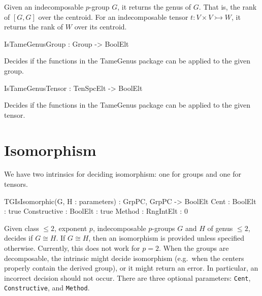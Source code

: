 \documentclass{documentation}
\begin{document}
Given an indecomposable $p$-group $G$, it returns the genus of $G$. 
That is, the rank of $[G,G]$ over the centroid.
For an indecomposable tensor $t: V\times V\rightarrowtail W$, it returns the rank of $W$ over its centroid. 


\begin{intrinsics}
IsTameGenusGroup : Group -> BoolElt
\end{intrinsics}

Decides if the functions in the TameGenus package can be applied to the given group.

\begin{intrinsics}
IsTameGenusTensor : TenSpcElt -> BoolElt
\end{intrinsics}

Decides if the functions in the TameGenus package can be applied to the given tensor.




\chapter{Isomorphism}

We have two intrinsics for deciding isomorphism: one for groups and one for tensors. 

\begin{intrinsics}
TGIsIsomorphic(G, H : parameters) : GrpPC, GrpPC -> BoolElt
    Cent : BoolElt : true
    Constructive : BoolElt : true
    Method : RngIntElt : 0
\end{intrinsics}

Given class $\leq 2$, exponent $p$, indecomposable $p$-groups $G$ and $H$ of genus $\leq 2$, decides if $G\cong H$.
If $G\cong H$, then an isomorphism is provided unless specified otherwise.
Currently, this does not work for $p=2$. When the groups are decomposable, the intrinsic might decide isomorphism (e.g.\ when the centers properly contain the derived group), or it might return an error. In particular, an incorrect decision should not occur.  
There are three optional parameters: \texttt{Cent}, \texttt{Constructive}, and \texttt{Method}.
\end{document}
